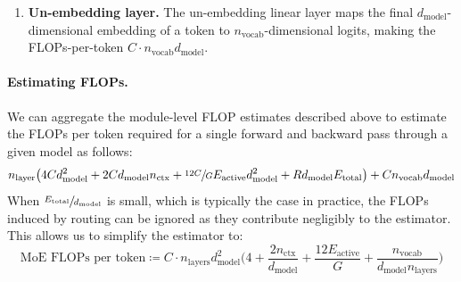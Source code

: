 \begin{enumerate}[left=10pt,itemsep=2pt]
\begin{itemize}
        \item \emph{Experts.} Each \moe experts corresponds to a GLU module~\citep{shazeer2017} with $d_{\text{ffn}} = 4 \cdot d_{\text{model}}$. Since there are $E_{\text{active}}$ active experts with granularity $G$, each involving three linear projections, this results in a FLOP estimate of $\sfrac{1}{G} \cdot 3 \cdot E_{\text{active}} \cdot C \cdot d_{\text{model}} d_{\text{ffn}} = \sfrac{12C}{G} \cdot  E_{\text{active}} \cdot d^2_{\text{model}}$. 
    \end{itemize}
    \item \textbf{Un-embedding layer.} The un-embedding linear layer maps the final $d_{\text{model}}$-dimensional embedding of a token to $n_{\text{vocab}}$-dimensional logits, making the FLOPs-per-token $C \cdot n_{\text{vocab}} d_{\text{model}}$.
\end{enumerate}

\paragraph{Estimating \moe FLOPs.}
We can aggregate the module-level FLOP estimates described above to estimate the FLOPs per token required for a single forward and backward pass through a given \moe model as follows:
\begin{equation*}   
    n_{\text{layer}} \big( 4Cd^2_{\text{model}} + 2Cd_{\text{model}}n_{\text{ctx}} + \sfrac{12C}{G} E_{\text{active}} d^2_{\text{model}} + Rd_{\text{model}}E_{\text{total}} \big) + C n_{\text{vocab}} d_{\text{model}}
\end{equation*}
When $\sfrac{E_{\text{total}}}{d_{\text{model}}}$ is small, which is typically the case in practice, the FLOPs induced by \moe routing can be ignored as they contribute negligibly to the estimator. This allows us to simplify the estimator to:
\begin{equation}
    \label{eq:flops}
    \text{MoE FLOPs per token} \coloneqq C \cdot n_{\text{layers}} d^2_{\text{model}} \Big( 4 + \frac{2n_{\text{ctx}}}{d_{\text{model}}} + \frac{12  E_{\text{active}}}{G}  +  \frac{n_{\text{vocab}}}{d_{\text{model}} n_{\text{layers}}}\Big)
\end{equation}


